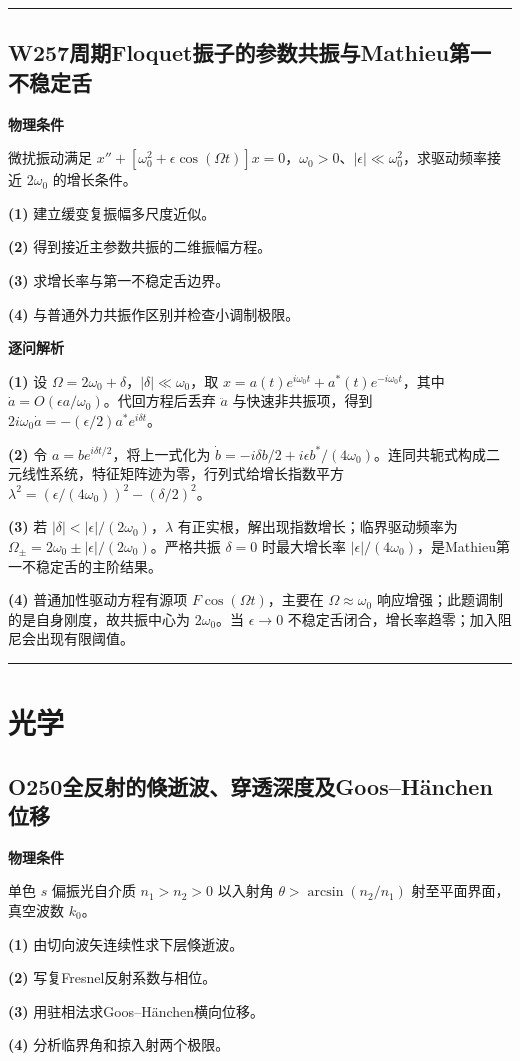 \documentclass[UTF8,a4paper,11pt,oneside,openany]{ctexbook}
\begin{document}
\par\bigskip\hrule\bigskip
\section*{W257\quad 周期Floquet振子的参数共振与Mathieu第一不稳定舌}
\textbf{物理条件}\par 微扰振动满足 \(x''+[\omega_0^2+\epsilon\cos(\Omega t)]x=0\)，\(\omega_0>0\)、\(|\epsilon|\ll\omega_0^2\)，求驱动频率接近 \(2\omega_0\) 的增长条件。
\par\noindent\textbf{(1)} 建立缓变复振幅多尺度近似。
\par\noindent\textbf{(2)} 得到接近主参数共振的二维振幅方程。
\par\noindent\textbf{(3)} 求增长率与第一不稳定舌边界。
\par\noindent\textbf{(4)} 与普通外力共振作区别并检查小调制极限。

\par\medskip\noindent\textbf{逐问解析}
\par\noindent\textbf{(1)} 设 \(\Omega=2\omega_0+\delta\)，\(|\delta|\ll\omega_0\)，取 \(x=a(t)e^{i\omega_0t}+a^*(t)e^{-i\omega_0t}\)，其中 \(\dot a=O(\epsilon a/\omega_0)\)。代回方程后丢弃 \(\ddot a\) 与快速非共振项，得到 \(2i\omega_0\dot a=-(\epsilon/2)a^*e^{i\delta t}\)。
\par\noindent\textbf{(2)} 令 \(a=b e^{i\delta t/2}\)，将上一式化为 \(\dot b=-i\delta b/2+i\epsilon b^*/(4\omega_0)\)。连同共轭式构成二元线性系统，特征矩阵迹为零，行列式给增长指数平方 \(\lambda^2=(\epsilon/(4\omega_0))^2-(\delta/2)^2\)。
\par\noindent\textbf{(3)} 若 \(|\delta|<|\epsilon|/(2\omega_0)\)，\(\lambda\) 有正实根，解出现指数增长；临界驱动频率为 \(\Omega_\pm=2\omega_0\pm|\epsilon|/(2\omega_0)\)。严格共振 \(\delta=0\) 时最大增长率 \(|\epsilon|/(4\omega_0)\)，是Mathieu第一不稳定舌的主阶结果。
\par\noindent\textbf{(4)} 普通加性驱动方程有源项 \(F\cos(\Omega t)\)，主要在 \(\Omega\approx\omega_0\) 响应增强；此题调制的是自身刚度，故共振中心为 \(2\omega_0\)。当 \(\epsilon\to0\) 不稳定舌闭合，增长率趋零；加入阻尼会出现有限阈值。

\par\bigskip\hrule\bigskip
\chapter{光学}
\section*{O250\quad 全反射的倏逝波、穿透深度及Goos–Hänchen位移}
\textbf{物理条件}\par 单色 \(s\) 偏振光自介质 \(n_1>n_2>0\) 以入射角 \(\theta>\arcsin(n_2/n_1)\) 射至平面界面，真空波数 \(k_0\)。
\par\noindent\textbf{(1)} 由切向波矢连续性求下层倏逝波。
\par\noindent\textbf{(2)} 写复Fresnel反射系数与相位。
\par\noindent\textbf{(3)} 用驻相法求Goos–Hänchen横向位移。
\par\noindent\textbf{(4)} 分析临界角和掠入射两个极限。
\end{document}
